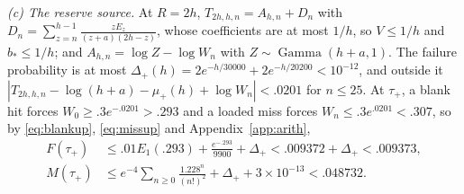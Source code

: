 \documentclass[11pt,a4paper]{article}
\theoremstyle{plain}
\theoremstyle{definition}
\theoremstyle{remark}
\newcommand{\Gam}{\operatorname{Gamma}}
\begin{document}
\emph{(c) The reserve source.} At $R=2h$, $T_{2h,h,n}=A_{h,n}+D_n$ with $D_n=\sum_{z=n}^{h-1}\frac{zE_z}{(z+a)(2h-z)}$, whose coefficients are at most $1/h$, so $V\le1/h$ and $b_*\le1/h$; and $A_{h,n}=\log Z-\log W_n$ with $Z\sim\Gam(h+a,1)$. The failure probability is at most $\Delta_+(h)=2e^{-h/30000}+2e^{-h/20200}<10^{-12}$, and outside it $|T_{2h,h,n}-\log(h+a)-\mu_+(h)+\log W_n|<.0201$ for $n\le25$. At $\tau_+$, a blank hit forces $W_0\ge.3e^{-.0201}>.293$ and a loaded miss forces $W_n\le.3e^{.0201}<.307$, so by \eqref{eq:blankup}, \eqref{eq:missup} and Appendix~\ref{app:arith},
\begin{align*}
F(\tau_+)&\le.01E_1(.293)+\frac{e^{-.293}}{9900}+\Delta_+<.009372+\Delta_+<.009373,\\
M(\tau_+)&\le e^{-4}\sum_{n\ge0}\frac{1.228^n}{(n!)^2}+\Delta_++3\times10^{-13}<.048732 . \tag*{\qedsymbol}
\end{align*}
\end{document}
